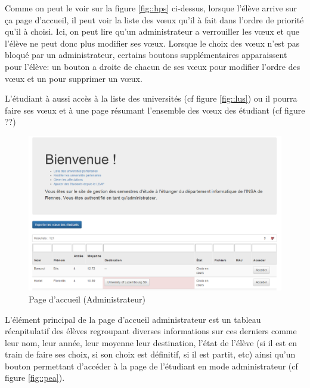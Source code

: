 \bigbreak

Comme on peut le voir sur la figure \ref{fig::hps} ci-dessus, lorsque l'élève arrive sur ça page d'accueil, il peut voir la liste des vœux qu'il à fait dans l'ordre de priorité qu'il à choisi. Ici, on peut lire qu'un administrateur a verrouiller les vœux et que l'élève ne peut donc plus modifier ses vœux. Lorsque le choix des vœux n'est pas bloqué par un administrateur, certains boutons supplémentaires apparaissent pour l'élève: un bouton a droite de chacun de ses vœux pour modifier l'ordre des vœux et un pour supprimer un vœux.

\bigbreak

L'étudiant à aussi accès à la liste des universités (cf figure \ref{fig::lus}) ou il pourra faire ses vœux et à une page résumant l'ensemble des vœux des étudiant (cf figure ??)

\begin{figure}[H]
	\includegraphics[scale=0.35]{images/HPA.png}
	\caption{Page d'accueil (Administrateur)}
	\label{fig::hpa}
\end{figure}

\bigbreak

L'élément principal de la page d'accueil administrateur est un tableau récapitulatif des élèves regroupant diverses informations sur ces derniers comme leur nom, leur année, leur moyenne leur destination, l'état de l'élève (si il est en train de faire ses choix, si son choix est définitif, si il est partit, etc) ainsi qu'un bouton permettant d'accéder à la page de l'étudiant en mode administrateur (cf figure \ref{fig::pea}).

\bigbreak

